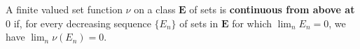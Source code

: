 A finite valued set function $\nu$ on a class $\mathbf{E}$ of sets is \textbf{continuous from above at $0$} if, for every decreasing sequence $\{E_n\}$ of sets in $\mathbf{E}$ for which $\lim_n E_n = 0$, we have $\lim_n \nu(E_n) = 0$.
